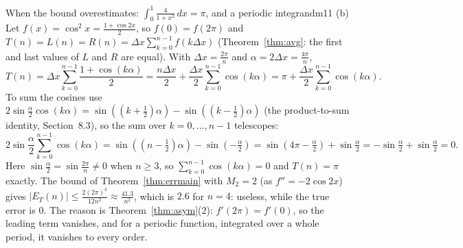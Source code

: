 \documentclass[11pt]{article}
\begin{document}
\begin{exmp}{When the bound overestimates: $\int_0^1\frac4{1+x^2}\,dx=\pi$, and a periodic integrand}{m11}
(b) Let $f(x)=\cos^2x=\frac{1+\cos2x}2$, so $f(0)=f(2\pi)$ and $T(n)=L(n)=R(n)=\Delta x\sum_{k=0}^{n-1}f(k\Delta x)$ (Theorem~\ref{thm:avg}: the first and last values of $L$ and $R$ are equal). With $\Delta x=\frac{2\pi}n$ and $\alpha=2\Delta x=\frac{4\pi}n$,
\[T(n)=\Delta x\sum_{k=0}^{n-1}\frac{1+\cos(k\alpha)}2=\frac{n\Delta x}2+\frac{\Delta x}2\sum_{k=0}^{n-1}\cos(k\alpha)=\pi+\frac{\Delta x}2\sum_{k=0}^{n-1}\cos(k\alpha).\]
To sum the cosines use $2\sin\frac\alpha2\cos(k\alpha)=\sin\left(\left(k+\frac12\right)\alpha\right)-\sin\left(\left(k-\frac12\right)\alpha\right)$ (the product-to-sum identity, Section~8.3), so the sum over $k=0,\ldots,n-1$ telescopes:
\[2\sin\frac\alpha2\sum_{k=0}^{n-1}\cos(k\alpha)=\sin\left(\left(n-\tfrac12\right)\alpha\right)-\sin\left(-\tfrac\alpha2\right)=\sin\left(4\pi-\tfrac\alpha2\right)+\sin\tfrac\alpha2=-\sin\tfrac\alpha2+\sin\tfrac\alpha2=0 .\]
Here $\sin\frac\alpha2=\sin\frac{2\pi}n\ne0$ when $n\ge3$, so $\sum_{k=0}^{n-1}\cos(k\alpha)=0$ and $T(n)=\pi$ exactly. The bound of Theorem~\ref{thm:errmain} with $M_2=2$ (as $f''=-2\cos2x$) gives $\lvert E_T(n)\rvert\le\frac{2(2\pi)^3}{12n^2}\approx\frac{41.3}{n^2}$, which is $2.6$ for $n=4$: useless, while the true error is $0$. The reason is Theorem~\ref{thm:asym}(2): $f'(2\pi)=f'(0)$, so the leading term vanishes, and for a periodic function, integrated over a whole period, it vanishes to every order.
\end{exmp}
\end{document}
